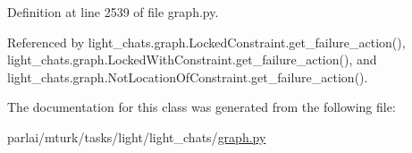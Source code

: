 Definition at line 2539 of file graph.\+py.



Referenced by light\+\_\+chats.\+graph.\+Locked\+Constraint.\+get\+\_\+failure\+\_\+action(), light\+\_\+chats.\+graph.\+Locked\+With\+Constraint.\+get\+\_\+failure\+\_\+action(), and light\+\_\+chats.\+graph.\+Not\+Location\+Of\+Constraint.\+get\+\_\+failure\+\_\+action().



The documentation for this class was generated from the following file\+:\begin{DoxyCompactItemize}
\item 
parlai/mturk/tasks/light/light\+\_\+chats/\hyperlink{parlai_2mturk_2tasks_2light_2light__chats_2graph_8py}{graph.\+py}\end{DoxyCompactItemize}
